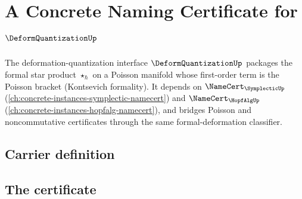 \chapter{A Concrete Naming Certificate for $\DeformQuantizationUp$}
\label{ch:concrete-instances-deformquantization-namecert}

The deformation-quantization interface $\DeformQuantizationUp$ packages the formal star product $\star_\hbar$ on a Poisson manifold whose first-order term is the Poisson bracket (Kontsevich formality). It depends on $\NameCert_{\SymplecticUp}$ (\autoref{ch:concrete-instances-symplectic-namecert}) and $\NameCert_{\HopfAlgUp}$ (\autoref{ch:concrete-instances-hopfalg-namecert}), and bridges Poisson and noncommutative certificates through the same formal-deformation classifier.

\section{Carrier definition}
\label{sec:deformquantization-carrier}

\section{The certificate}
\label{sec:deformquantization-certificate}

